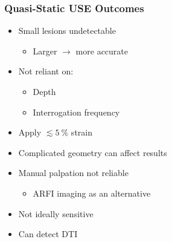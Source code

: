 \documentclass{beamer}
\newcommand{\percent}{\%}
\begin{document}

		\begin{frame}
			\frametitle{Quasi-Static USE Outcomes}
			\begin{itemize}
				\item Small lesions undetectable
				\begin{itemize}
					\item Larger $\rightarrow$ more accurate
				\end{itemize}
				\item Not reliant on:
				\begin{itemize}
					\item Depth
					\item Interrogation frequency
				\end{itemize}
				\item Apply $\lesssim \SI{5}{\percent}$ strain
				\item Complicated geometry can affect results
				\item Manual palpation not reliable
				\begin{itemize}
					\item ARFI imaging as an alternative
				\end{itemize}
				\item \alert{Not ideally sensitive}
				\item \alert{Can detect DTI}
			\end{itemize}
		\end{frame}
\end{document}
